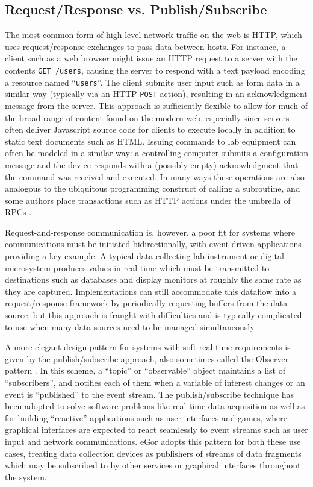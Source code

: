 \documentclass[../thesis]{subfiles}
\begin{document}
\subsection{Request/Response vs. Publish/Subscribe}
The most common form of high-level network traffic on the web is HTTP,
which uses request/response exchanges to pass data between hosts. For
instance, a client such as a web browser might issue an HTTP request
to a server with the contents \texttt{GET /users}, causing the server
to respond with a text payload encoding a resource named
``\texttt{users}''. The client submits user input such as form data in
a similar way (typically via an HTTP \texttt{POST} action), resulting
in an acknowledgment message from the server. This approach is
sufficiently flexible to allow for much of the broad range of content
found on the modern web, especially since servers often deliver
Javascript source code for clients to execute locally in addition to
static text documents such as HTML. Issuing commands to lab equipment
can often be modeled in a similar way: a controlling computer submits
a configuration message and the device responds with a (possibly
empty) acknowledgment that the command was received and executed.  In
many ways these operations are also analogous to the ubiquitous
programming construct of calling a subroutine, and some authors place
transactions such as HTTP actions under the umbrella of \glspl{RPC}
\cite{DBLP:journals/corr/abs-0911-4395}.

Request-and-response communication is, however, a poor fit for systems
where communications must be initiated bidirectionally, with
event-driven applications providing a key example. A typical
data-collecting lab instrument or digital microsystem produces values
in real time which must be transmitted to destinations such as
databases and display monitors at roughly the same rate as they are
captured. Implementations can still accommodate this dataflow into a
request/response framework by periodically requesting buffers from the
data source, but this approach is fraught with difficulties and is
typically complicated to use when many data sources need to be managed
simultaneously.

A more elegant design pattern for systems with soft real-time
requirements is given by the publish/subscribe approach, also
sometimes called the Observer pattern \cite{GangOfFour}. In this
scheme, a ``topic'' or ``observable'' object maintains a list of
``subscribers'', and notifies each of them when a variable of interest
changes or an event is ``published'' to the event stream. The
publish/subscribe technique has been adopted to solve software
problems like real-time data acquisition as well as for building
``reactive'' applications such as user interfaces and games, where
graphical interfaces are expected to react seamlessly to event streams
such as user input and network communications. eGor adopts this
pattern for both these use cases, treating data collection devices as
publishers of streams of data fragments which may be subscribed to by
other services or graphical interfaces throughout the system.
\end{document}
